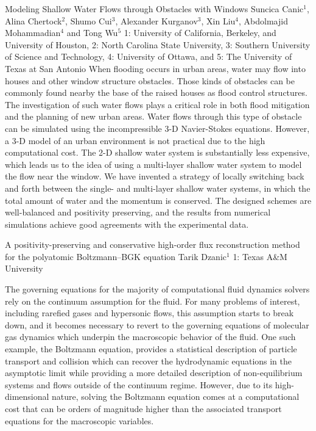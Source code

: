 \begin{addmargin}[2em]{0em}
\vspace{1.5ex}
\abs
{Modeling Shallow Water Flows through Obstacles with Windows}
{Suncica Canic$^{1}$, Alina Chertock$^{2}$, Shumo Cui$^{3}$, Alexander Kurganov$^{3}$, Xin Liu$^{4}$, Abdolmajid Mohammadian$^{4}$ and Tong Wu$^{5}$}
{1: University of California, Berkeley, and University of Houston, 2: North Carolina State University, 3: Southern University of Science and Technology, 4: University of Ottawa, and 5: The University of Texas at San Antonio}
{When flooding occurs in urban areas, water may flow into houses and other window structure obstacles. Those kinds of obstacles can be commonly found nearby the base of the raised houses as flood control structures. The investigation of such water flows plays a critical role in both flood mitigation and the planning of new urban areas. Water flows through this type of obstacle can be simulated using the incompressible 3-D Navier-Stokes equations. However, a 3-D model of an urban environment is not practical due to the high computational cost. The 2-D shallow water system is substantially less expensive, which leads us to the idea of using a multi-layer shallow water system to model the flow near the window. We have invented a strategy of locally switching back and forth between the single- and multi-layer shallow water systems, in which the total amount of water and the momentum is conserved. The designed schemes are well-balanced and positivity preserving, and the results from numerical simulations achieve good agreements with the experimental data.}


\vspace{1.5ex}
\abs
{A positivity-preserving and conservative high-order flux reconstruction method for the polyatomic Boltzmann–BGK equation}
{Tarik Dzanic$^{1}$}
{1: Texas A\&M University}
{The governing equations for the majority of computational fluid dynamics solvers rely on the continuum assumption for the fluid. For many problems of interest, including rarefied gases and hypersonic flows, this assumption starts to break down, and it becomes necessary to revert to the governing equations of molecular gas dynamics which underpin the macroscopic behavior of the fluid. One such example, the Boltzmann equation, provides a statistical description of particle transport and collision which can recover the hydrodynamic equations in the asymptotic limit while providing a more detailed description of non-equilibrium systems and flows outside of the continuum regime. However, due to its high-dimensional nature, solving the Boltzmann equation comes at a computational cost that can be orders of magnitude higher than the associated transport equations for the macroscopic variables.

}
\end{addmargin}
